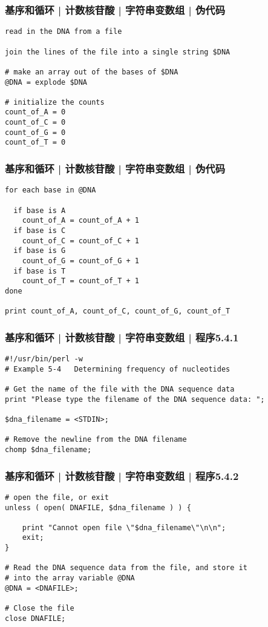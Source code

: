 \begin{frame}[fragile]
  \frametitle{基序和循环 | 计数核苷酸 | 字符串变数组 | 伪代码}
\begin{lstlisting}
read in the DNA from a file

join the lines of the file into a single string $DNA

# make an array out of the bases of $DNA
@DNA = explode $DNA

# initialize the counts
count_of_A = 0
count_of_C = 0
count_of_G = 0
count_of_T = 0
\end{lstlisting}
\end{frame}

\begin{frame}[fragile]
  \frametitle{基序和循环 | 计数核苷酸 | 字符串变数组 | 伪代码}
\begin{lstlisting}
for each base in @DNA

  if base is A
    count_of_A = count_of_A + 1
  if base is C
    count_of_C = count_of_C + 1
  if base is G
    count_of_G = count_of_G + 1
  if base is T
    count_of_T = count_of_T + 1
done

print count_of_A, count_of_C, count_of_G, count_of_T
\end{lstlisting}
\end{frame}

\begin{frame}[fragile]
  \frametitle{基序和循环 | 计数核苷酸 | 字符串变数组 | 程序5.4.1}
\begin{lstlisting}
#!/usr/bin/perl -w
# Example 5-4   Determining frequency of nucleotides

# Get the name of the file with the DNA sequence data
print "Please type the filename of the DNA sequence data: ";

$dna_filename = <STDIN>;

# Remove the newline from the DNA filename
chomp $dna_filename;
\end{lstlisting}
\end{frame}

\begin{frame}[fragile]
  \frametitle{基序和循环 | 计数核苷酸 | 字符串变数组 | 程序5.4.2}
\begin{lstlisting}[firstnumber=12]
# open the file, or exit
unless ( open( DNAFILE, $dna_filename ) ) {

    print "Cannot open file \"$dna_filename\"\n\n";
    exit;
}

# Read the DNA sequence data from the file, and store it
# into the array variable @DNA
@DNA = <DNAFILE>;

# Close the file
close DNAFILE;
\end{lstlisting}
\end{frame}

